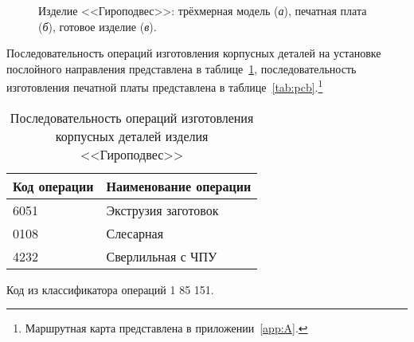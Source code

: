 \begin{figure}[htb]
	\caption[Изделие <<Гироподвес>>]%
	{Изделие <<Гироподвес>>: трёхмерная модель (\textit{а}), печатная плата  (\textit{б}), готовое изделие (\textit{в}).}\label{fig:gimbal}
\end{figure}

Последовательность операций изготовления корпусных деталей на установке послойного направления представлена в таблице~\cref{tab:case}, последовательность изготовления печатной платы представлена в таблице~\cref{tab:pcb}.\footnote{Маршрутная карта представлена в приложении~\cref{app:A}.}

\begin{table} [!htb]
	\centering
	\caption{Последовательность операций изготовления корпусных деталей изделия <<Гироподвес>>} \vspace{4pt}
	\label{tab:case}
	\begin{threeparttable}
		\begin{tabularx}{\linewidth}{ll}
			\toprule
			\textbf{Код операции\tnote{1}} & \textbf{Наименование операции} \\
			\midrule
			6051 & Экструзия заготовок \\
			0108 & Слесарная \\ 
			4232 & Сверлильная с ЧПУ \\
			\bottomrule
		\end{tabularx}
		\begin{tablenotes} \footnotesize
			\item [1] Код из классификатора операций 1 85 151.
		\end{tablenotes}
	\end{threeparttable}
\end{table}

